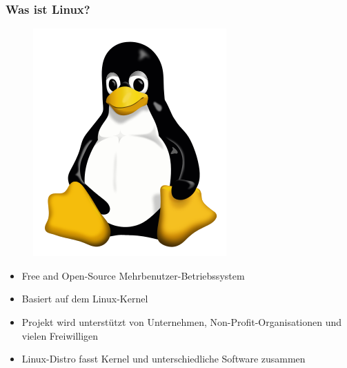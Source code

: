 \begin{frame}
\frametitle{Was ist Linux?}
\begin{figure}
\includegraphics[scale=0.17]{resources/tux.png}
\end{figure}
\begin{itemize}
	\item Free and Open-Source Mehrbenutzer-Betriebssystem
	\item Basiert auf dem Linux-Kernel
	\item Projekt wird unterstützt von Unternehmen, Non-Profit-Organisationen und vielen Freiwilligen
	\item Linux-Distro fasst Kernel und unterschiedliche Software zusammen
\end{itemize}
\end{frame}


